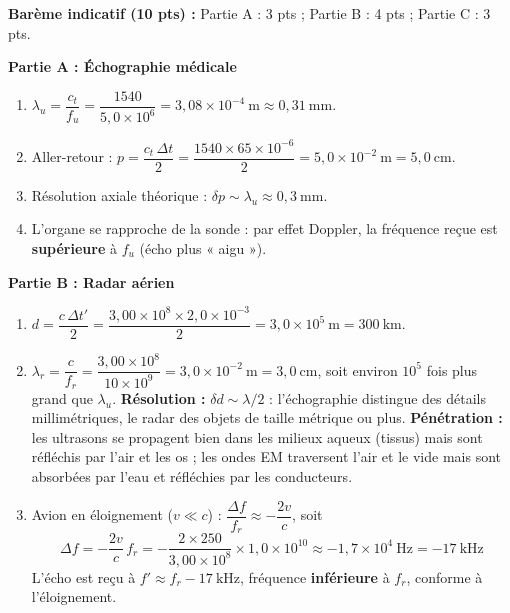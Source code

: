 \documentclass[11pt]{article}
\begin{document}
\begin{corrige}
\textbf{Barème indicatif (10 pts) :} Partie A : 3 pts ; Partie B : 4 pts ; Partie C : 3 pts.

\textbf{Partie A : Échographie médicale}
\begin{enumerate}
    \item $\lambda_u = \dfrac{c_t}{f_u} = \dfrac{1540}{5{,}0 \times 10^{6}} = 3{,}08 \times 10^{-4}\ \text{m} \approx 0{,}31\ \text{mm}$.
    \item Aller-retour : $p = \dfrac{c_t\,\Delta t}{2} = \dfrac{1540 \times 65 \times 10^{-6}}{2} = 5{,}0 \times 10^{-2}\ \text{m} = 5{,}0\ \text{cm}$.
    \item Résolution axiale théorique : $\delta p \sim \lambda_u \approx 0{,}3\ \text{mm}$.
    \item L'organe se rapproche de la sonde : par effet Doppler, la fréquence reçue est \textbf{supérieure} à $f_u$ (écho plus « aigu »).
\end{enumerate}

\textbf{Partie B : Radar aérien}
\begin{enumerate}
    \item $d = \dfrac{c\,\Delta t'}{2} = \dfrac{3{,}00 \times 10^{8} \times 2{,}0 \times 10^{-3}}{2} = 3{,}0 \times 10^{5}\ \text{m} = 300\ \text{km}$.
    \item $\lambda_r = \dfrac{c}{f_r} = \dfrac{3{,}00 \times 10^{8}}{10 \times 10^{9}} = 3{,}0 \times 10^{-2}\ \text{m} = 3{,}0\ \text{cm}$, soit environ $10^{5}$ fois plus grand que $\lambda_u$.
    \textbf{Résolution :} $\delta d \sim \lambda/2$ : l'échographie distingue des détails millimétriques, le radar des objets de taille métrique ou plus.
    \textbf{Pénétration :} les ultrasons se propagent bien dans les milieux aqueux (tissus) mais sont réfléchis par l'air et les os ; les ondes EM traversent l'air et le vide mais sont absorbées par l'eau et réfléchies par les conducteurs.
    \item Avion en éloignement ($v \ll c$) : $\dfrac{\Delta f}{f_r} \approx -\dfrac{2v}{c}$, soit
    \[
    \Delta f = -\frac{2v}{c}\,f_r = -\frac{2 \times 250}{3{,}00 \times 10^{8}} \times 1{,}0 \times 10^{10} \approx -1{,}7 \times 10^{4}\ \text{Hz} = -17\ \text{kHz}
    \]
    L'écho est reçu à $f' \approx f_r - 17\ \text{kHz}$, fréquence \textbf{inférieure} à $f_r$, conforme à l'éloignement.
\end{enumerate}


\end{corrige}
\end{document}
